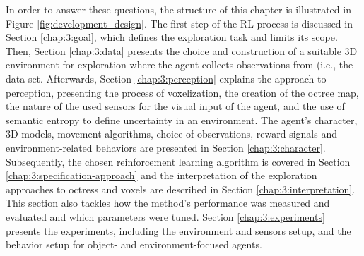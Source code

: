 In order to answer these questions, the structure of this chapter is illustrated in Figure \ref{fig:development_design}.
The first step of the RL process is discussed in Section \ref{chap:3:goal}, which defines the exploration task and limits its scope. 
Then, Section \ref{chap:3:data} presents the choice and construction of a suitable 3D environment for exploration where the agent collects observations from (i.e., the data set.
Afterwards, Section \ref{chap:3:perception} explains the approach to perception, presenting the process of voxelization, the creation of the octree map, the nature of the used sensors for the visual input of the agent, and the use of semantic entropy to define uncertainty in an environment.
% 
The agent's character, 3D models, movement algorithms, choice of observations, reward signals and environment-related behaviors are presented in Section \ref{chap:3:character}.
Subsequently, the chosen reinforcement learning algorithm is covered in Section \ref{chap:3:specification-approach} and the interpretation of the exploration approaches to octress and voxels are described in Section \ref{chap:3:interpretation}. 
This section also tackles how the method's performance was measured and evaluated and which parameters were tuned.
Section \ref{chap:3:experiments} presents the experiments, including the environment and sensors setup, and the behavior setup for object- and environment-focused agents.

